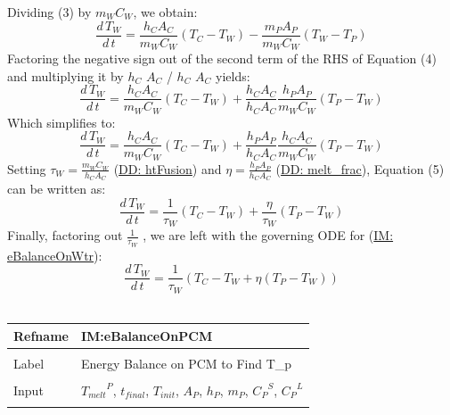 \documentclass[12pt]{article}
\begin{document}
Dividing (3) by ${m_{W}}$${C_{W}}$, we obtain:
\begin{dmath}
\frac{d\,{T_{W}}}{d\,t}=\frac{{h_{C}} {A_{C}}}{{m_{W}} {C_{W}}} \left({T_{C}}-{T_{W}}\right)-\frac{{m_{P}} {A_{P}}}{{m_{W}} {C_{W}}} \left({T_{W}}-{T_{P}}\right)
\end{dmath}
Factoring the negative sign out of the second term of the RHS of Equation (4) and multiplying it by ${h_{C}}$ ${A_{C}}$ / ${h_{C}}$ ${A_{C}}$ yields:
\begin{dmath}
\frac{d\,{T_{W}}}{d\,t}=\frac{{h_{C}} {A_{C}}}{{m_{W}} {C_{W}}} \left({T_{C}}-{T_{W}}\right)+\frac{{h_{C}} {A_{C}}}{{h_{C}} {A_{C}}} \frac{{h_{P}} {A_{P}}}{{m_{W}} {C_{W}}} \left({T_{P}}-{T_{W}}\right)
\end{dmath}
Which simplifies to:
\begin{dmath}
\frac{d\,{T_{W}}}{d\,t}=\frac{{h_{C}} {A_{C}}}{{m_{W}} {C_{W}}} \left({T_{C}}-{T_{W}}\right)+\frac{{h_{P}} {A_{P}}}{{h_{C}} {A_{C}}} \frac{{h_{C}} {A_{C}}}{{m_{W}} {C_{W}}} \left({T_{P}}-{T_{W}}\right)
\end{dmath}
Setting ${τ_{W}}=\frac{{m_{W}} {C_{W}}}{{h_{C}} {A_{C}}}$ (\hyperref[DD:htFusion]{DD: htFusion}) and $η=\frac{{h_{P}} {A_{P}}}{{h_{C}} {A_{C}}}$ (\hyperref[DD:melt.frac]{DD: melt\_frac}), Equation (5) can be written as:
\begin{dmath}
\frac{d\,{T_{W}}}{d\,t}=\frac{1}{{τ_{W}}} \left({T_{C}}-{T_{W}}\right)+\frac{η}{{τ_{W}}} \left({T_{P}}-{T_{W}}\right)
\end{dmath}
Finally, factoring out $\frac{1}{{τ_{W}}}$ , we are left with the governing ODE for (\hyperref[IM:eBalanceOnWtr]{IM: eBalanceOnWtr}):
\begin{dmath}
\frac{d\,{T_{W}}}{d\,t}=\frac{1}{{τ_{W}}} \left({T_{C}}-{T_{W}}+η \left({T_{P}}-{T_{W}}\right)\right)
\end{dmath}
~\newline
 \noindent \begin{minipage}{\textwidth}
\begin{tabular}{p{} p{}}
\toprule \textbf{Refname} & \textbf{IM:eBalanceOnPCM}
\label{IM:eBalanceOnPCM}
\\ \midrule \\
Label & Energy Balance on PCM to Find T\_p
        \\ \midrule \\
        Input & ${{T_{melt}}^{P}}$, ${t_{final}}$, ${T_{init}}$, ${A_{P}}$, ${h_{P}}$, ${m_{P}}$, ${{C_{P}}^{S}}$, ${{C_{P}}^{L}}$
                \\ \midrule \\

\end{tabular}
\end{minipage}$$
\end{document}
